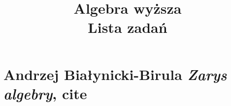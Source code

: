 \documentclass[a4paper,11pt]{article}
\title{Algebra wyższa \\
  {\Large Lista zadań}}
\numberwithin{equation}{section}
\begin{document}





\maketitle





\section{Andrzej Białynicki-Birula \textit{Zarys
    algebry}, cite{}}

\label{sec:Oznaczenia-i-konwencje}
\end{document}
